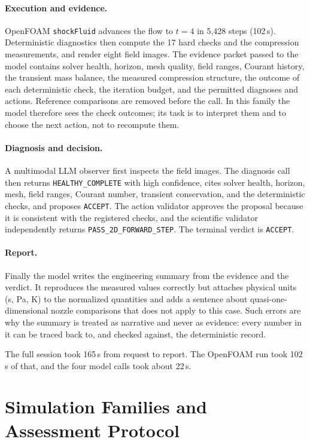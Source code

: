 \documentclass[11pt]{article}
\begin{document}
\paragraph{Execution and evidence.} OpenFOAM \texttt{shockFluid} advances
the flow to $t=4$ in 5,428 steps (102\,s). Deterministic diagnostics then
compute the 17 hard checks and the compression measurements, and render
eight field images. The evidence packet passed to the model contains solver
health, horizon, mesh quality, field ranges, Courant history, the transient
mass balance, the measured compression structure, the outcome of each
deterministic check, the iteration budget, and the permitted diagnoses and
actions. Reference comparisons are removed before the call. In this family
the model therefore sees the check outcomes; its task is to interpret them
and to choose the next action, not to recompute them.

\paragraph{Diagnosis and decision.} A multimodal LLM observer first
inspects the field images. The diagnosis call then returns
\texttt{HEALTHY\_COMPLETE} with high confidence, cites solver health,
horizon, mesh, field ranges, Courant number, transient conservation, and the
deterministic checks, and proposes \texttt{ACCEPT}. The action validator
approves the proposal because it is consistent with the registered checks,
and the scientific validator independently returns
\texttt{PASS\_2D\_FORWARD\_STEP}. The terminal verdict is \texttt{ACCEPT}.

\paragraph{Report.} Finally the model writes the engineering summary from
the evidence and the verdict. It reproduces the measured values correctly
but attaches physical units (s, Pa, K) to the normalized quantities and adds
a sentence about quasi-one-dimensional nozzle comparisons that does not apply
to this case. Such errors are why the summary is treated as narrative and
never as evidence: every number in it can be traced back to, and checked
against, the deterministic record.

The full session took 165\,s from request to report. The OpenFOAM run took
102\,s of that, and the four model calls took about 22\,s.


\section{Simulation Families and Assessment Protocol}
\label{sec:experiments}
\end{document}
